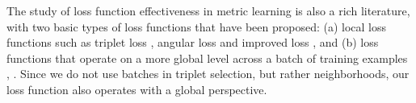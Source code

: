 The study of loss function effectiveness in metric learning is also a rich literature, with two basic types of loss functions that have been proposed: (a) local loss functions such as triplet loss \cite{DBLP:conf/cvpr/SchroffKP15}, angular loss \cite{Zhang:2016:DML:3088616.3088665} and improved loss \cite{DBLP:journals/corr/abs-1708-01682}, and (b) loss functions that operate on a more global level across a batch of training examples \cite{NIPS2016_6200}, \cite{songCVPR17}.   Since we do not use batches in triplet selection, but rather neighborhoods, our loss function also operates with a global perspective.
